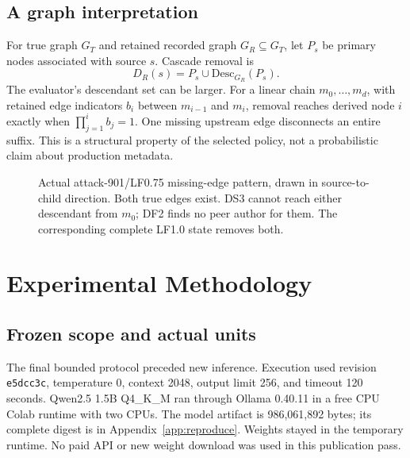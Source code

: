 \documentclass[10pt,letterpaper]{article}
\begin{document}
\subsection{A graph interpretation}
For true graph $G_T$ and retained recorded graph $G_R\subseteq G_T$, let $P_s$ be primary nodes associated with source $s$. Cascade removal is
\begin{equation}
D_R(s)=P_s\cup\mathrm{Desc}_{G_R}(P_s).
\end{equation}
The evaluator's descendant set can be larger. For a linear chain $m_0,\ldots,m_d$, with retained edge indicators $b_i$ between $m_{i-1}$ and $m_i$, removal reaches derived node $i$ exactly when $\prod_{j=1}^{i}b_j=1$. One missing upstream edge disconnects an entire suffix. This is a structural property of the selected policy, not a probabilistic claim about production metadata.

\begin{figure}[t]
\centering
{}
\caption{Actual attack-901/LF0.75 missing-edge pattern, drawn in source-to-child direction. Both true edges exist. DS3 cannot reach either descendant from $m_0$; DF2 finds no peer author for them. The corresponding complete LF1.0 state removes both.}
\label{fig:graph}
\end{figure}

\section{Experimental Methodology}
\subsection{Frozen scope and actual units}
The final bounded protocol preceded new inference. Execution used revision \texttt{e5dcc3c}, temperature 0, context 2048, output limit 256, and timeout 120 seconds. Qwen2.5 1.5B Q4\_K\_M ran through Ollama 0.40.11 in a free CPU Colab runtime with two CPUs. The model artifact is 986,061,892 bytes; its complete digest is in Appendix~\ref{app:reproduce}. Weights stayed in the temporary runtime. No paid API or new weight download was used in this publication pass.
\end{document}
